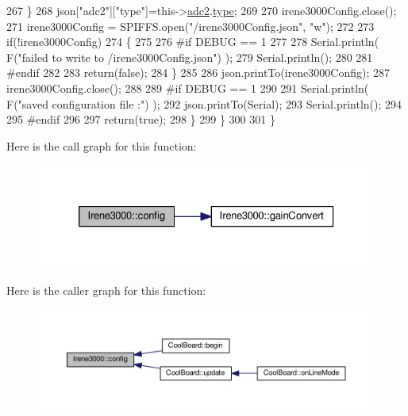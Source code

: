 \begin{DoxyCode}
267             \}
268             json[\textcolor{stringliteral}{"adc2"}][\textcolor{stringliteral}{"type"}]=this->\hyperlink{classIrene3000_aae3a95a1c83c766cd2f299ce471c337e}{adc2}.\hyperlink{structIrene3000_1_1state_a9897a7e02727db6351d44006eec73799}{type};
269 
270             irene3000Config.close();
271             irene3000Config = SPIFFS.open(\textcolor{stringliteral}{"/irene3000Config.json"}, \textcolor{stringliteral}{"w"});
272 
273             \textcolor{keywordflow}{if}(!irene3000Config)
274             \{
275             
276 \textcolor{preprocessor}{            #if DEBUG == 1}
277 
278                 Serial.println( F(\textcolor{stringliteral}{"failed to write to /irene3000Config.json"}) );
279                 Serial.println();
280             
281 \textcolor{preprocessor}{            #endif }
282 
283                 \textcolor{keywordflow}{return}(\textcolor{keyword}{false});
284             \}
285 
286             json.printTo(irene3000Config);
287             irene3000Config.close();
288             
289 \textcolor{preprocessor}{        #if DEBUG == 1 }
290 
291             Serial.println( F(\textcolor{stringliteral}{"saved configuration file :"})  );
292             json.printTo(Serial);
293             Serial.println();
294         
295 \textcolor{preprocessor}{        #endif}
296 
297             \textcolor{keywordflow}{return}(\textcolor{keyword}{true}); 
298         \}
299     \}   
300 
301 \}
\end{DoxyCode}
Here is the call graph for this function\+:
\nopagebreak
\begin{figure}[H]
\begin{center}
\leavevmode
\includegraphics[width=326pt]{classIrene3000_afed5c35e4b23963c157847ef27c11e9c_cgraph}
\end{center}
\end{figure}
Here is the caller graph for this function\+:
\nopagebreak
\begin{figure}[H]
\begin{center}
\leavevmode
\includegraphics[width=350pt]{classIrene3000_afed5c35e4b23963c157847ef27c11e9c_icgraph}
\end{center}
\end{figure}
\mbox{\label{classIrene3000_abcad62d1201a59f8dd3ba87048002728}} 
